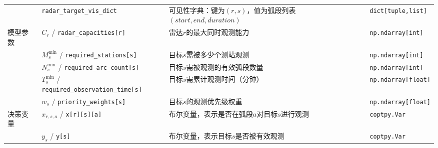 \documentclass[openany,12pt,UTF8]{ctexart}
\begin{document}
\begin{table}
\begin{tabularx}{\columnwidth}{llXl}
             & \texttt{radar\_target\_vis\_dict}                      & 可见性字典：键为$(r,s)$，值为弧段列表$(start, end, duration)$ & \texttt{dict[tuple,list]}  \\
        模型参数 & $C_r$ / \texttt{radar\_capacities[r]}                  & 雷达$r$的最大同时观测能力                                 & \texttt{np.ndarray[int]}   \\
             & $M_s^{\min}$ / \texttt{required\_stations[s]}          & 目标$s$需被多少个测站观测                                 & \texttt{np.ndarray[int]}   \\
             & $N_s^{\min}$ / \texttt{required\_arc\_count[s]}        & 目标$s$需被观测的有效弧段数量                               & \texttt{np.ndarray[int]}   \\
             & $T_s^{\min}$ / \texttt{required\_observation\_time[s]} & 目标$s$需累计观测时间（分钟）                               & \texttt{np.ndarray[float]} \\
             & $w_s$ / \texttt{priority\_weights[s]}                  & 目标$s$的观测优先级权重                                  & \texttt{np.ndarray[float]} \\
        决策变量 & $x_{r,s,a}$ / \texttt{x[r][s][a]}                      & 布尔变量，表示是否在弧段$a$对目标$s$进行观测                      & \texttt{coptpy.Var}        \\
             & $y_s$ / \texttt{y[s]}                                  & 布尔变量，表示目标$s$是否被有效观测                            & \texttt{coptpy.Var}        \\
        \bottomrule
    \end{tabularx}
\end{table}
\end{document}
